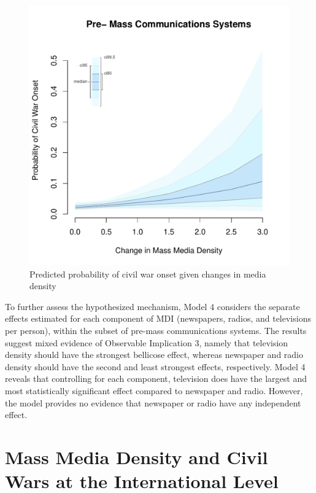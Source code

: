 \documentclass[11pt,article,oneside]{memoir}
\makeatletter
\def\maxwidth{\ifdim\Gin@nat@width>\linewidth\linewidth
\else\Gin@nat@width\fi}
\let\Oldincludegraphics\includegraphics
\renewcommand{\includegraphics}[1]{\Oldincludegraphics[width=\maxwidth]{#1}}
\makeatother
\begin{document}
\clearpage

\begin{figure} 
\includegraphics{figure/d_mdi_effect.pdf} 
\caption{Predicted probability of civil war onset given changes in media density} 
\label{myFigz} 
\end{figure}

To further assess the hypothesized mechanism, Model 4 considers the
separate effects estimated for each component of MDI (newspapers,
radios, and televisions per person), within the subset of pre-mass
communications systems. The results suggest mixed evidence of Observable
Implication 3, namely that television density should have the strongest
bellicose effect, whereas newspaper and radio density should have the
second and least strongest effects, respectively. Model 4 reveals that
controlling for each component, television does have the largest and
most statistically significant effect compared to newspaper and radio.
However, the model provides no evidence that newspaper or radio have any
independent effect.

\section{Mass Media Density and Civil Wars at the International
Level}\label{mass-media-density-and-civil-wars-at-the-international-level}
\end{document}
